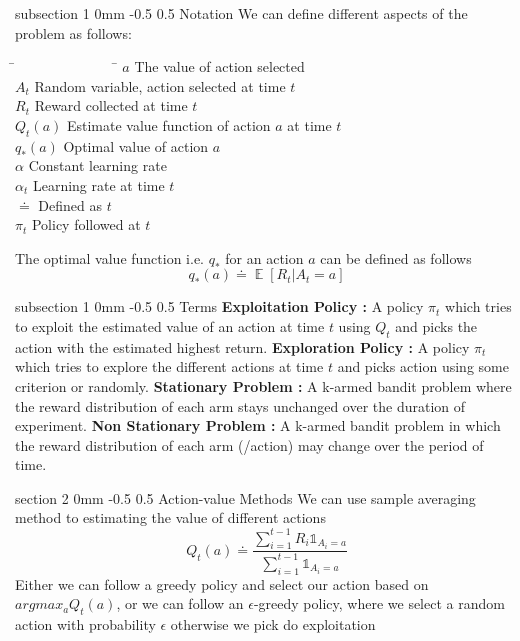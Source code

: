 \documentclass[twocolumn,11pt]{article}
\makeatletter
\DeclareMathOperator{\E}{\mathbb{E}}
\renewcommand{\section}{\@startsection
{section}%
{2}%
{0mm}%
{-0.5\baselineskip}%
{0.5\baselineskip}%
{\bfseries\color{blue}}} %
\renewcommand{\subsection}{\@startsection
{subsection}%
{1}%
{0mm}%
{-0.5\baselineskip}%
{0.5\baselineskip}%
{\bfseries\color{blue}}} %
\makeatother
\begin{document}
\subsection{Notation}
We can define different aspects of the problem as follows:
\noindent
\begin{tabbing}
\=~~~~~~~~~~~~~~  \= \kill
\>$a$   \>The value of action selected \\
\>$A_t$    \>Random variable, action selected at time $t$\\
\>$R_t $    \>Reward collected at time $t$\\
\>$Q_t(a)$    \>Estimate value function of action $a$ at time $t$\\
\>$q_*(a)$    \>Optimal value of action $a$\\
\>$\alpha$    \>Constant learning rate\\
\>$\alpha_t$    \> Learning rate at time $t$\\
\>$\doteq$    \>Defined as $t$\\
\>$\pi_t$    \>Policy followed at $t$\\
\end{tabbing}
The optimal value function i.e. $q_*$ for an action $a$ can be defined as follows\useshortskip
\begin{equation}
    q_*(a) \doteq \E[R_t| A_t = a]
\end{equation}

\subsection{Terms}
\textbf{Exploitation Policy :} A policy $\pi_t$ which tries to exploit the estimated value of an action at time $t$ using $Q_t$ and picks the action with the estimated highest return.\newline
\textbf{Exploration Policy :} A policy $\pi_t$ which tries to explore the  different actions at time $t$ and picks action using some criterion or randomly.\newline
\textbf{Stationary Problem : } A k-armed bandit problem where the reward distribution of each arm stays unchanged over the duration of experiment.\newline
\textbf{Non Stationary Problem :} A k-armed bandit problem in which the reward distribution of each arm (/action) may change over the period of time.

\section{Action-value Methods}
We can use sample averaging method to estimating the value of different actions
\useshortskip\begin{equation}
    Q_t(a) \doteq  \dfrac{\sum_{i=1}^{t-1}R_i\mathbb{1}_{A_i = a}}{\sum_{i=1}^{t-1}\mathbb{1}_{A_i = a}}
\end{equation}
Either we can follow a greedy policy and select our action based on $argmax_a Q_t(a)$, or we can follow an $\epsilon$-greedy policy, where we select a random action with probability $\epsilon$ otherwise we pick do exploitation
\end{document}
